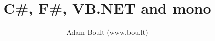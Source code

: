 \documentclass[oneside]{book}
\begin{document}
\author{Adam Boult (www.bou.lt)}
\title{C\#, F\#, VB.NET and mono}
\maketitle

\setcounter{tocdepth}{0}
\tableofcontents


\end{document}
